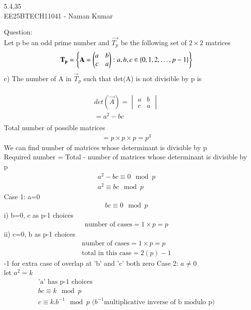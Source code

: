\documentclass[journal]{IEEEtran}
\author{EE25BTECH11041-Naman Kumar }
\begin{document}
\begin{center}
    \huge{5.4.35}\\
    \large{EE25BTECH11041 - Naman Kumar}
\end{center}
Question:\\
Let p be an odd prime number and $\vec{T_p}$ be the following set of $2\times2$ matrices
\begin{align}
\vec{T_p}=\cbrak{\Vec{A}=\begin{pmatrix}a&b\\c&a\end{pmatrix}:a,b,c \in \cbrak{0,1,2,\dots,p-1} }
\end{align}
c) The number of A in $\vec{T}_p$ such that det(A) is not divisible by p is\\
\solution \\
\begin{align}
    det(\vec{A})=\begin{vmatrix}a&b\\c&a\end{vmatrix}\\
    =a^2-bc\\
\end{align}
Total number of possible matrices
\begin{align}
    =p\times p \times p=p^3
\end{align}
We can find number of matrices whose determinant is divisible by p\\
Required number = Total - number of matrices whose determinant is divisible by p
\begin{align}
    a^2-bc \equiv 0 \mod p \\
    a^2\equiv bc \mod p
\end{align}
Case 1: a=0
\begin{align}
    bc \equiv 0 \mod p
\end{align}
i) b=0, c as p-1 choices
\begin{align}
    \text{number of cases} = 1\times p=p
\end{align}
ii) c=0, b as p-1 choices
\begin{align}
    \text{number of cases} = 1\times p=p\\
    \text{total in this case}= 2(p)-1\label{1}
\end{align}
-1 for extra case of overlap at 'b' and 'c' both zero
Case 2: $a\neq0$\\
let $a^2=k$
\begin{align}
    \text{'a' has p-1 choices}\\
    bc \equiv k \mod p\\
    c\equiv k.b^{-1} \mod p \text{ ($b^{-1}$multiplicative inverse of b modulo p)}
\end{align}
\end{document}
